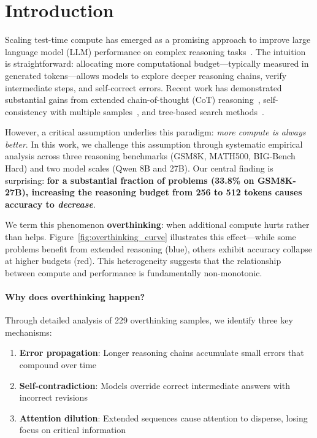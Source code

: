 \section{Introduction}

Scaling test-time compute has emerged as a promising approach to improve large language model (LLM) performance on complex reasoning tasks~\cite{wei2022chain,yao2024tree}.
The intuition is straightforward: allocating more computational budget---typically measured in generated tokens---allows models to explore deeper reasoning chains, verify intermediate steps, and self-correct errors.
Recent work has demonstrated substantial gains from extended chain-of-thought (CoT) reasoning~\cite{kojima2022large}, self-consistency with multiple samples~\cite{wang2022self}, and tree-based search methods~\cite{yao2024tree}.

However, a critical assumption underlies this paradigm: \emph{more compute is always better}.
In this work, we challenge this assumption through systematic empirical analysis across three reasoning benchmarks (GSM8K, MATH500, BIG-Bench Hard) and two model scales (Qwen 8B and 27B).
Our central finding is surprising: \textbf{for a substantial fraction of problems (33.8\% on GSM8K-27B), increasing the reasoning budget from 256 to 512 tokens causes accuracy to \emph{decrease}}.

We term this phenomenon \textbf{overthinking}: when additional compute hurts rather than helps.
Figure~\ref{fig:overthinking_curve} illustrates this effect---while some problems benefit from extended reasoning (blue), others exhibit accuracy collapse at higher budgets (red).
This heterogeneity suggests that the relationship between compute and performance is fundamentally non-monotonic.

\paragraph{Why does overthinking happen?}
Through detailed analysis of 229 overthinking samples, we identify three key mechanisms:
\begin{enumerate}[leftmargin=*,nosep]
    \item \textbf{Error propagation}: Longer reasoning chains accumulate small errors that compound over time
    \item \textbf{Self-contradiction}: Models override correct intermediate answers with incorrect revisions
    \item \textbf{Attention dilution}: Extended sequences cause attention to disperse, losing focus on critical information
\end{enumerate}

